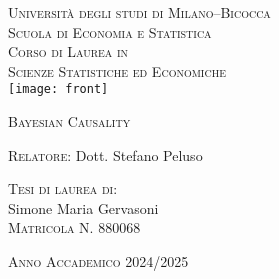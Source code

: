 

\pagestyle{empty} 

\begin{titlepage}
  
 \begin{center}
 {\large  

 \hfill

 \vfill
 {
 {\Large \textsc{Università degli studi di Milano--Bicocca}}\\
 {\textsc{Scuola di Economia e Statistica}}\\
 \vfill
	\textsc{Corso di Laurea  in} \\
	\textsc{Scienze Statistiche ed Economiche} \\
	\vfill
	\texttt{[image: front]}
 \vfill
 
 {\Huge\color{Maroon}\textsc{Bayesian Causality}}\\
 }
}
\end{center}

\vfill
{
\large
\begin{flushleft}
\textsc{Relatore}: Dott. Stefano Peluso \\
\end{flushleft}

\vfill
\begin{flushright}
\textsc{Tesi di laurea di}:\\
 Simone Maria Gervasoni\\
\textsc{Matricola N. 880068}
\end{flushright}

\vfill
\begin{center}
\textsc{Anno Accademico 2024/2025}
\end{center}

}
\end{titlepage}

